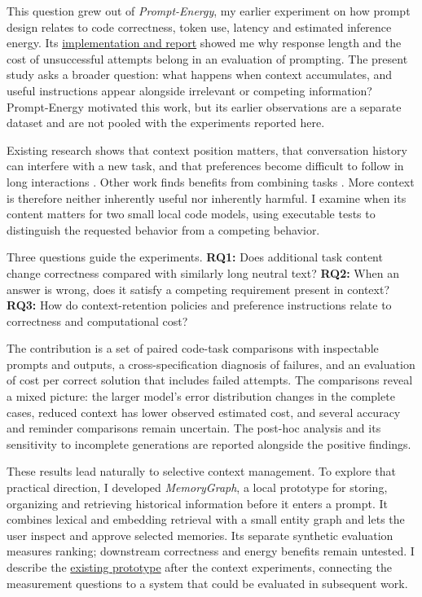 \documentclass[10pt,a4paper,twocolumn]{article}
\begin{document}
This question grew out of \emph{Prompt-Energy}, my earlier experiment on how
prompt design relates to code correctness, token use, latency and estimated
inference energy. Its \href{https://github.com/buildgit17626-ctrl/Prompt-Energy}{implementation and report}
showed me why response length and the cost of unsuccessful attempts belong in
an evaluation of prompting. The present study asks a broader question: what
happens when context accumulates, and useful instructions appear alongside
irrelevant or competing information? Prompt-Energy motivated this work, but its
earlier observations are a separate dataset and are not pooled with the
experiments reported here.

Existing research shows that context position matters, that conversation
history can interfere with a new task, and that preferences become difficult
to follow in long interactions \citep{lost,interference,prefeval}. Other work
finds benefits from combining tasks \citep{multitask}. More context is therefore
neither inherently useful nor inherently harmful. I examine when its content
matters for two small local code models, using executable tests to distinguish
the requested behavior from a competing behavior.

Three questions guide the experiments. \textbf{RQ1:} Does additional task
content change correctness compared with similarly long neutral text?
\textbf{RQ2:} When an answer is wrong, does it satisfy a competing requirement
present in context? \textbf{RQ3:} How do context-retention policies and preference
instructions relate to correctness and computational cost?

The contribution is a set of paired code-task comparisons with inspectable
prompts and outputs, a cross-specification diagnosis of failures, and an
evaluation of cost per correct solution that includes failed attempts. The
comparisons reveal a mixed picture: the larger model's error distribution
changes in the complete cases, reduced context has lower observed estimated
cost, and several accuracy and reminder comparisons remain uncertain. The
post-hoc analysis and its sensitivity to incomplete generations are reported
alongside the positive findings.

These results lead naturally to selective context management. To explore that
practical direction, I developed \emph{MemoryGraph}, a local prototype for
storing, organizing and retrieving historical information before it enters a
prompt. It combines lexical and embedding retrieval with a small entity graph
and lets the user inspect and approve selected memories. Its separate synthetic
evaluation measures ranking; downstream correctness and energy benefits remain
untested. I describe the \href{https://github.com/buildgit17626-ctrl/MemoryGraph}{existing prototype}
after the context experiments, connecting the measurement questions to a system
that could be evaluated in subsequent work.
\end{document}
